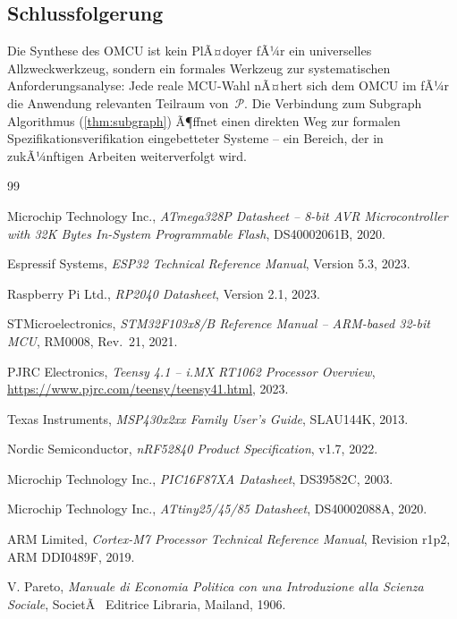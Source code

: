 ﻿\documentclass[12pt, a4paper]{article}
\theoremstyle{plain}
\theoremstyle{definition}
\theoremstyle{remark}
\newcommand{\omcu}{\textsc{OMCU}}
\begin{document}
\subsection{Schlussfolgerung}

Die Synthese des \omcu{} ist kein PlÃ¤doyer fÃ¼r ein universelles
Allzweckwerkzeug, sondern ein formales Werkzeug zur systematischen
Anforderungsanalyse: Jede reale MCU-Wahl nÃ¤hert sich dem \omcu{}
im fÃ¼r die Anwendung relevanten Teilraum von~$\mathcal{P}$.
Die Verbindung zum Subgraph Algorithmus (\cref{thm:subgraph}) Ã¶ffnet
einen direkten Weg zur formalen Spezifikationsverifikation eingebetteter
Systeme -- ein Bereich, der in zukÃ¼nftigen Arbeiten weiterverfolgt wird.

\begin{thebibliography}{99}

Microchip Technology Inc.,
\textit{ATmega328P Datasheet -- 8-bit AVR Microcontroller with 32K Bytes In-System Programmable Flash},
DS40002061B, 2020.

Espressif Systems,
\textit{ESP32 Technical Reference Manual},
Version 5.3, 2023.

Raspberry Pi Ltd.,
\textit{RP2040 Datasheet},
Version 2.1, 2023.

STMicroelectronics,
\textit{STM32F103x8/B Reference Manual -- ARM-based 32-bit MCU},
RM0008, Rev.~21, 2021.

PJRC Electronics,
\textit{Teensy 4.1 -- i.MX RT1062 Processor Overview},
\url{https://www.pjrc.com/teensy/teensy41.html}, 2023.

Texas Instruments,
\textit{MSP430x2xx Family User's Guide},
SLAU144K, 2013.

Nordic Semiconductor,
\textit{nRF52840 Product Specification},
v1.7, 2022.

Microchip Technology Inc.,
\textit{PIC16F87XA Datasheet},
DS39582C, 2003.

Microchip Technology Inc.,
\textit{ATtiny25/45/85 Datasheet},
DS40002088A, 2020.

ARM Limited,
\textit{Cortex-M7 Processor Technical Reference Manual},
Revision r1p2, ARM DDI0489F, 2019.

V. Pareto,
\textit{Manuale di Economia Politica con una Introduzione alla Scienza Sociale},
SocietÃ  Editrice Libraria, Mailand, 1906.


\end{thebibliography}
\end{document}
